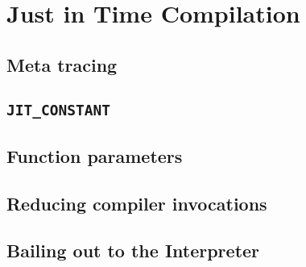\chapter{Just in Time Compilation}
\section{Meta tracing}
\section{\texttt{JIT\_CONSTANT}}
\section{Function parameters}
\section{Reducing compiler invocations}
\section{Bailing out to the Interpreter}
